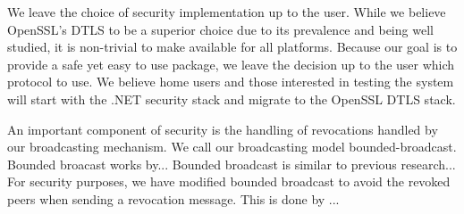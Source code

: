 \documentclass[conference]{IEEEtran}
\begin{document}


We leave the choice of security implementation up to the user.  While we believe
OpenSSL's DTLS to be a superior choice due to its prevalence and being well
studied, it is non-trivial to make available for all platforms.  Because our
goal is to provide a safe yet easy to use package, we leave the decision up to
the user which protocol to use.  We believe home users and those interested in
testing the system will start with the .NET security stack and migrate to the
OpenSSL DTLS stack.

An important component of security is the handling of revocations handled by our
broadcasting mechanism.  We call our broadcasting model bounded-broadcast.
Bounded broacast works by...  Bounded broadcast is similar to previous research...
For security purposes, we have modified bounded broadcast to avoid the revoked
peers when sending a revocation message.  This is done by ...
\end{document}
